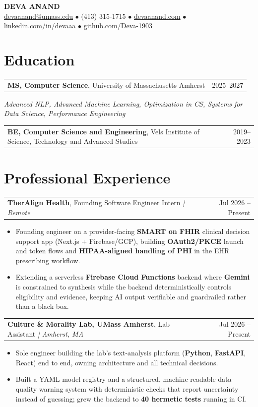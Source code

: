 \documentclass[letterpaper,11pt]{article}
\makeatletter
\newcommand{\eduItem}[3]{%
  \begin{tabular*}{\textwidth}{@{}l@{\extracolsep{\fill}}r@{}}
    \textbf{#1}, #2 & #3 \\
  \end{tabular*}\par
}
\newcommand{\expItem}[4]{%
  \vspace{2pt}
  \begin{tabular*}{\textwidth}{@{}l@{\extracolsep{\fill}}r@{}}
    \textbf{#1}, #2 \textit{| #3} & #4 \\
  \end{tabular*}\par\vspace{-3pt}
}
\makeatother
\begin{document}
\begin{center}
    {\fontsize{18}{20}\selectfont\bfseries DEVA ANAND}\\ \vspace{3pt}
    {\small
    \href{mailto:devaanand@umass.edu}{devaanand@umass.edu}
    \enspace$\bullet$\enspace
    (413) 315-1715
    \enspace$\bullet$\enspace
    \href{https://devaanand.com}{devaanand.com}
    \enspace$\bullet$\enspace
    \href{https://linkedin.com/in/devaaa/}{linkedin.com/in/devaaa}
    \enspace$\bullet$\enspace
    \href{https://github.com/Deva-1903}{github.com/Deva-1903}}
\end{center}
\vspace{-8pt}

\section{Education}
\eduItem{MS, Computer Science}{University of Massachusetts Amherst}{2025--2027}
{\small\textit{Advanced NLP, Advanced Machine Learning, Optimization in CS, Systems for Data Science, Performance Engineering}}\par
\vspace{3pt}
\eduItem{BE, Computer Science and Engineering}{Vels Institute of Science, Technology and Advanced Studies}{2019--2023}

\section{Professional Experience}

\expItem{TherAlign Health}{Founding Software Engineer Intern}{Remote}{Jul 2026 -- Present}
\begin{itemize}
  \item Founding engineer on a provider-facing \textbf{SMART on FHIR} clinical decision support app (Next.js + Firebase/GCP), building \textbf{OAuth2/PKCE} launch and token flows and \textbf{HIPAA-aligned handling of PHI} in the EHR prescribing workflow.
  \item Extending a serverless \textbf{Firebase Cloud Functions} backend where \textbf{Gemini} is constrained to synthesis while the backend deterministically controls eligibility and evidence, keeping AI output verifiable and guardrailed rather than a black box.
\end{itemize}

\expItem{Culture \& Morality Lab, UMass Amherst}{Lab Assistant}{Amherst, MA}{Jul 2026 -- Present}
\begin{itemize}
  \item Sole engineer building the lab's text-analysis platform (\textbf{Python}, \textbf{FastAPI}, React) end to end, owning architecture and all technical decisions.
  \item Built a YAML model registry and a structured, machine-readable data-quality warning system with deterministic checks that report uncertainty instead of guessing; grew the backend to \textbf{40 hermetic tests} running in CI.
\end{itemize}
\end{document}
